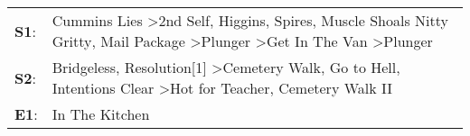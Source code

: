 \begin{supertabular}{p{0.03\textwidth}p{0.92\textwidth}}
 \textbf{S1}:  &  Cummins Lies\textsuperscript{} \textgreater \enspace 2nd Self\textsuperscript{}, \enspace Higgins\textsuperscript{}, \enspace Spires\textsuperscript{}, \enspace Muscle Shoals Nitty Gritty\textsuperscript{}, \enspace Mail Package\textsuperscript{} \textgreater \enspace Plunger\textsuperscript{} \textgreater \enspace Get In The Van\textsuperscript{} \textgreater \enspace Plunger\textsuperscript{}  \enspace  \\
 \textbf{S2}:  &                                                                                          Bridgeless\textsuperscript{}, \enspace Resolution[1]\textsuperscript{} \textgreater \enspace Cemetery Walk\textsuperscript{}, \enspace Go to Hell\textsuperscript{}, \enspace Intentions Clear\textsuperscript{} \textgreater \enspace Hot for Teacher\textsuperscript{}, \enspace Cemetery Walk II\textsuperscript{}  \enspace  \\
 \textbf{E1}:  &                                                                                                                                                                                                                                                                                                                                                                               In The Kitchen\textsuperscript{}  \enspace  \\
\end{supertabular}

